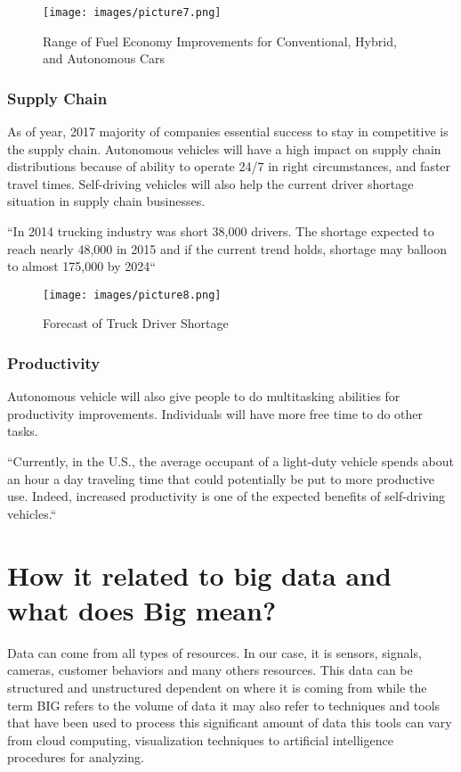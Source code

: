 \documentclass[sigconf]{acmart}
\begin{document}
\begin{figure}[!ht]
  \centering
      \texttt{[image: images/picture7.png]}
  \caption{Range of Fuel Economy Improvements for Conventional, Hybrid, and Autonomous Cars}\label{F:fuelconsumption}
\end{figure}

\subsubsection{Supply Chain} As of year, 2017 majority of companies essential success to stay in competitive is the supply chain.  Autonomous vehicles will have a high impact on supply chain distributions because of ability to operate 24/7 in right circumstances, and faster travel times. Self-driving vehicles will also help the current driver shortage situation in supply chain businesses.

    ``In 2014 trucking industry was short 38,000 drivers. The shortage expected to reach nearly 48,000 in 2015 and if the current trend holds, shortage may balloon to almost 175,000 by 2024``\cite{ATA}

\begin{figure}[h]
  \centering
      \texttt{[image: images/picture8.png]}
  \caption{Forecast of Truck Driver Shortage}\label{F:small}
\end{figure}

\subsubsection{Productivity}Autonomous vehicle will also give people to do multitasking abilities for productivity improvements. Individuals will have more free time to do other tasks. 

``Currently, in the U.S., the average occupant of a light-duty vehicle spends about an hour a day traveling time that could potentially be put to more productive use. Indeed, increased productivity is one of the expected benefits of self-driving vehicles.``\cite{michigan}



\section{How it related to big data and what does Big mean?}
\par Data can come from all types of resources. In our case, it is sensors, signals, cameras, customer behaviors and many others resources. This data can be structured and unstructured dependent on where it is coming from while the term BIG refers to the volume of data it may also refer to techniques and tools that have been used to process this significant amount of data this tools can vary from cloud computing, visualization techniques to artificial intelligence procedures for analyzing.\cite{www-webo}
\end{document}

